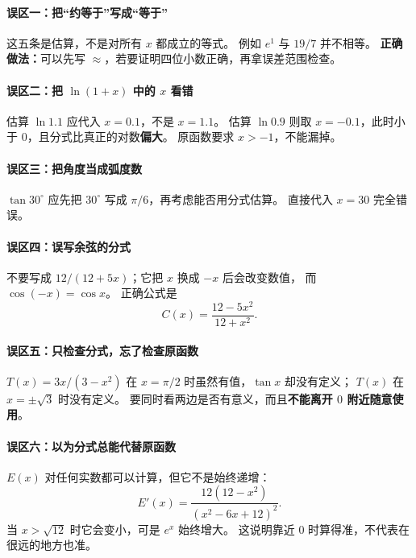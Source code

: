 \clearpage
\begin{trapbox}
\paragraph{误区一：把“约等于”写成“等于”}
这五条是估算，不是对所有 $x$ 都成立的等式。
例如 $e^1$ 与 $19/7$ 并不相等。
\textbf{正确做法：}可以先写 $\approx$，若要证明四位小数正确，再拿误差范围检查。

\paragraph{误区二：把 $\ln(1+x)$ 中的 $x$ 看错}
估算 $\ln1.1$ 应代入 $x=0.1$，不是 $x=1.1$。
估算 $\ln0.9$ 则取 $x=-0.1$，此时小于 $0$，且分式比真正的对数\textbf{偏大}。
原函数要求 $x>-1$，不能漏掉。

\paragraph{误区三：把角度当成弧度数}
$\tan30^\circ$ 应先把 $30^\circ$ 写成 $\pi/6$，再考虑能否用分式估算。
直接代入 $x=30$ 完全错误。

\paragraph{误区四：误写余弦的分式}
不要写成 $12/(12+5x)$；它把 $x$ 换成 $-x$ 后会改变数值，
而 $\cos(-x)=\cos x$。
正确公式是
\[
\boxed{C(x)=\frac{12-5x^2}{12+x^2}}.
\]

\paragraph{误区五：只检查分式，忘了检查原函数}
$T(x)=3x/(3-x^2)$ 在 $x=\pi/2$ 时虽然有值，$\tan x$ 却没有定义；
$T(x)$ 在 $x=\pm\sqrt3$ 时没有定义。
要同时看两边是否有意义，而且\textbf{不能离开 $0$ 附近随意使用}。

\paragraph{误区六：以为分式总能代替原函数}
$E(x)$ 对任何实数都可以计算，但它不是始终递增：
\[
E'(x)=\frac{12(12-x^2)}{(x^2-6x+12)^2}.
\]
当 $x>\sqrt{12}$ 时它会变小，可是 $e^x$ 始终增大。
这说明靠近 $0$ 时算得准，不代表在很远的地方也准。


\end{trapbox}
